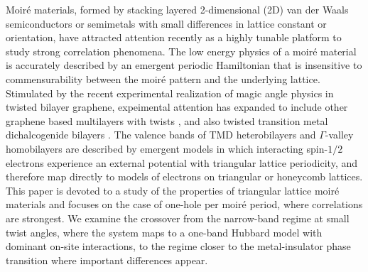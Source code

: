\documentclass[%
 reprint,
 superscriptaddress,
 amsmath,amssymb,
 aps,
 prx,
 floatfix,
]{revtex4-2}
\newcommand{\<}{\langle}
\renewcommand{\>}{\rangle}
\renewcommand{\(}{\left(}
\renewcommand{\)}{\right)}
\renewcommand{\[}{\left[}
\renewcommand{\]}{\right]}
\begin{document}
Moir\'e materials, formed by stacking layered 2-dimensional (2D) van der Waals 
semiconductors or semimetals with small differences in lattice constant or orientation, 
have attracted attention recently as a highly tunable platform to study strong correlation phenomena.  
The low energy physics of a moir\'e material is accurately described by an emergent periodic Hamiltonian \cite{Bistritzer12233,PhysRevB.82.121407,fengchengHubbard} 
that is insensitive to commensurability between the moir\'e pattern and the underlying lattice. 
Stimulated by the recent experimental realization \cite{kim2017tunable,cao2018correlated,cao2018unconventional} of magic angle physics in twisted bilayer graphene, expeimental attention has expanded to 
include other graphene based multilayers with twists   \cite{Yankowitz1059,lu2019superconductors,sharpe2019emergent,Serlin2020IntrinsicQA,cao2020tunable,shen2020correlated,chen2019evidence,chen2019signatures}, and also  
twisted transition metal dichalcogenide bilayers \cite{tang2020tTMD,regan2020mott,wang2020correlated,xu2020correlated,jin2021stripe,li2021charge,li2021imaging,fractionTMD2020,mak2021continuousMIT,dean2021quantumcritical,li2021quantum}.  
The valence bands of TMD heterobilayers 
and $\Gamma$-valley homobilayers \cite{mattia2020gammaValley} are 
described by emergent models in which interacting spin-$1/2$ electrons 
experience an external potential with triangular lattice periodicity, 
and therefore map directly to models of electrons on triangular or honeycomb lattices.  
This paper is devoted to a study of the properties of
triangular lattice moir\'e materials
and focuses on the case of one-hole per moir\'e period, where 
correlations are strongest.  
We examine the crossover from the narrow-band regime at 
small twist angles, 
where the system maps to a one-band Hubbard model with dominant on-site interactions,
to the regime closer to the metal-insulator phase transition where important differences appear.
\end{document}
